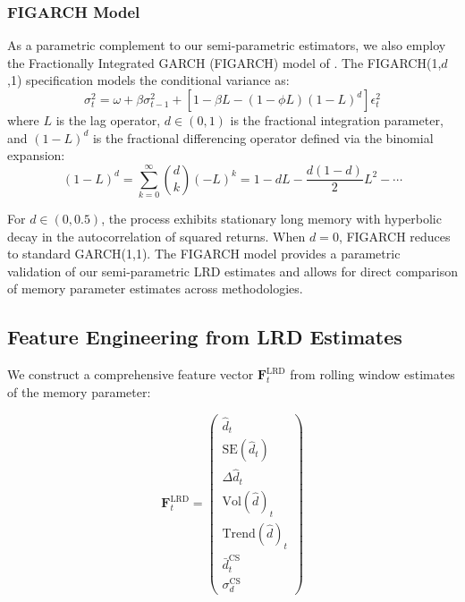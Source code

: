 \documentclass[12pt,a4paper]{article}
\begin{document}
\subsubsection{FIGARCH Model}

As a parametric complement to our semi-parametric estimators, we also employ the Fractionally Integrated GARCH (FIGARCH) model of \citet{baillie1996figarch}. The FIGARCH(1,$d$,1) specification models the conditional variance as:
\begin{equation}
    \sigma_t^2 = \omega + \beta \sigma_{t-1}^2 + \left[1 - \beta L - (1-\phi L)(1-L)^d\right] \epsilon_t^2
\end{equation}
where $L$ is the lag operator, $d \in (0, 1)$ is the fractional integration parameter, and $(1-L)^d$ is the fractional differencing operator defined via the binomial expansion:
\begin{equation}
    (1-L)^d = \sum_{k=0}^{\infty} \binom{d}{k} (-L)^k = 1 - dL - \frac{d(1-d)}{2}L^2 - \cdots
\end{equation}

For $d \in (0, 0.5)$, the process exhibits stationary long memory with hyperbolic decay in the autocorrelation of squared returns. When $d = 0$, FIGARCH reduces to standard GARCH(1,1). The FIGARCH model provides a parametric validation of our semi-parametric LRD estimates and allows for direct comparison of memory parameter estimates across methodologies.

\subsection{Feature Engineering from LRD Estimates}

We construct a comprehensive feature vector $\mathbf{F}_t^{\text{LRD}}$ from rolling window estimates of the memory parameter:

\begin{equation}
    \mathbf{F}_t^{\text{LRD}} = \begin{pmatrix}
        \hat{d}_t \\
        \text{SE}(\hat{d}_t) \\
        \Delta\hat{d}_t \\
        \text{Vol}(\hat{d})_t \\
        \text{Trend}(\hat{d})_t \\
        \bar{d}_t^{\text{CS}} \\
        \sigma_d^{\text{CS}}
    \end{pmatrix}
\end{equation}
\end{document}
